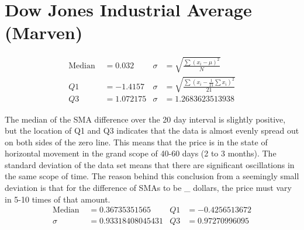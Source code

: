 \documentclass{article}
\begin{document}
\pagebreak
\section{Dow Jones Industrial Average (Marven)}


\begin{align*}
    \text{Median }&=0.032     &        \sigma&=\sqrt{\frac{\sum\left(x_i-\mu\right)^2}{N}}\\
    Q1&=-1.4157     &  \sigma    &=\sqrt{\frac{\sum\left(x_i-\frac{1}{21}\sum x_i\right)^2}{21}}\\
    Q3&=1.072175 &        \sigma &=1.2683623513938
\end{align*}



\begin{figure}[h]
    \centering
\end{figure}

The median of the SMA difference over the 20 day interval is slightly positive, but the location of Q1 and Q3 indicates that the data is almost evenly spread out on both sides of the zero line. This means that the price is in the state of horizontal movement in the grand scope of 40-60 days (2 to 3 months). The standard deviation of the data set means that there are significant oscillations in the same scope of time. The reason behind this conclusion from a seemingly small deviation is that for the difference of SMAs to be \_ dollars, the price must vary in 5-10 times of that amount.
\begin{align*}
    \text{Median }&=0.36735351565        &    Q1&=-0.4256513672\\
    \sigma&=0.93318408045431        &  Q3&=0.97270996095
\end{align*}
\end{document}
